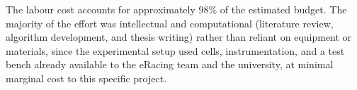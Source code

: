 The labour cost accounts for approximately $98\%$ of the 
estimated budget. The majority of 
the effort was intellectual and computational (literature review, algorithm 
development, and thesis writing) rather than reliant on equipment or 
materials, since the experimental setup used cells, instrumentation, and a test 
bench already available to the eRacing team and the university, at minimal 
marginal cost to this specific project.


